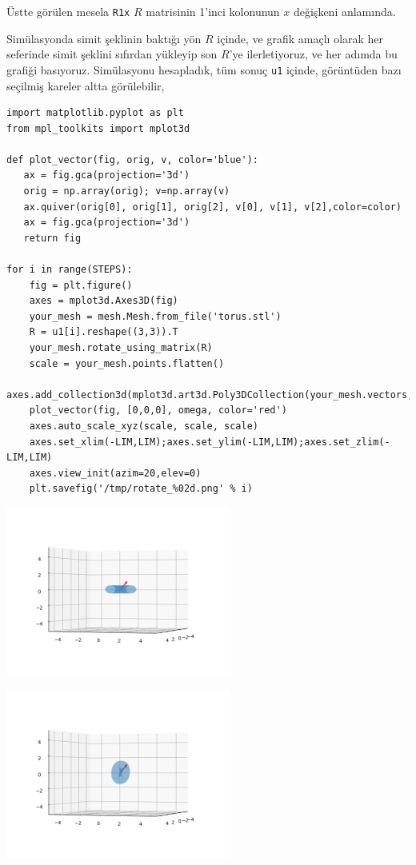 \documentclass[12pt,fleqn]{article}\usepackage{../../common}
\begin{document}
Üstte görülen mesela \verb!R1x! $R$ matrisinin 1'inci kolonunun $x$ değişkeni
anlamında.

Simülasyonda simit şeklinin baktığı yön $R$ içinde, ve grafik amaçlı olarak her
seferinde simit şeklini sıfırdan yükleyip son $R$'ye ilerletiyoruz, ve her
adımda bu grafiği basıyoruz.  Simülasyonu hesapladık, tüm sonuç \verb!u1!
içinde, görüntüden bazı seçilmiş kareler altta görülebilir,

\begin{verbatim}
import matplotlib.pyplot as plt
from mpl_toolkits import mplot3d

def plot_vector(fig, orig, v, color='blue'):
   ax = fig.gca(projection='3d')
   orig = np.array(orig); v=np.array(v)
   ax.quiver(orig[0], orig[1], orig[2], v[0], v[1], v[2],color=color)
   ax = fig.gca(projection='3d')  
   return fig

for i in range(STEPS):
    fig = plt.figure()
    axes = mplot3d.Axes3D(fig)
    your_mesh = mesh.Mesh.from_file('torus.stl')
    R = u1[i].reshape((3,3)).T
    your_mesh.rotate_using_matrix(R)
    scale = your_mesh.points.flatten()
    axes.add_collection3d(mplot3d.art3d.Poly3DCollection(your_mesh.vectors,alpha=0.3))
    plot_vector(fig, [0,0,0], omega, color='red')
    axes.auto_scale_xyz(scale, scale, scale)
    axes.set_xlim(-LIM,LIM);axes.set_ylim(-LIM,LIM);axes.set_zlim(-LIM,LIM)
    axes.view_init(azim=20,elev=0)
    plt.savefig('/tmp/rotate_%02d.png' % i)  
\end{verbatim}

\includegraphics[width=20em]{sim1/rotate_00.png}

\includegraphics[width=20em]{sim1/rotate_08.png}
\end{document}
